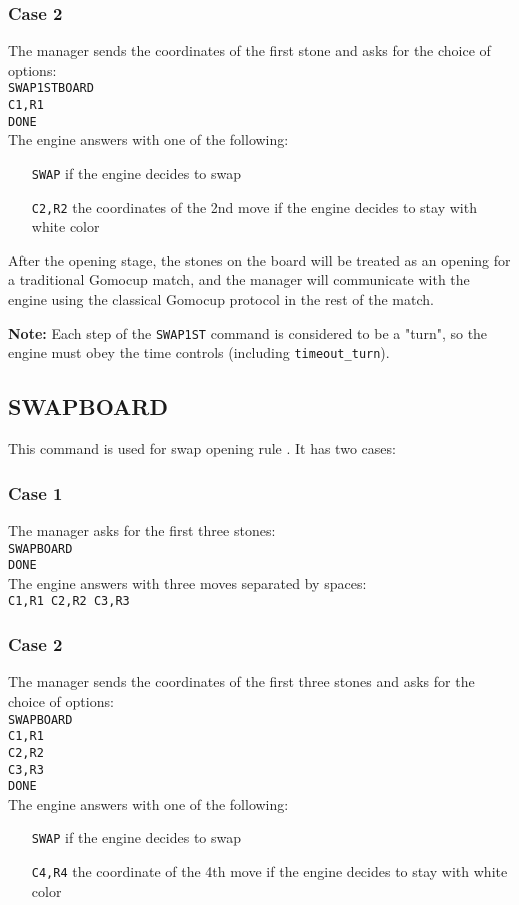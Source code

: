 \documentclass[12pt,a4paper]{article}
\begin{document}
\subsubsection{Case 2}
The manager sends the coordinates of the first stone and asks for the choice of options:\\
\texttt{SWAP1STBOARD}\\
\texttt{C1,R1}\\
\texttt{DONE}\\
The engine answers with one of the following:
\begin{enumerate}[leftmargin=7.5em]
\item[\texttt{SWAP}]{if the engine decides to swap}
\item[\texttt{C2,R2}]{the coordinates of the 2nd move if the engine decides to stay with white color}
\end{enumerate}

After the opening stage, the stones on the board will be treated as an opening for a traditional Gomocup match, and the manager will communicate with the engine using the classical Gomocup protocol in the rest of the match.

\textbf{Note:} Each step of the \texttt{SWAP1ST} command is considered to be a "turn", so the engine must obey the time controls (including \texttt{timeout{\_}turn}).


\subsection{SWAPBOARD}
\label{cmd_swap}
This command is used for swap opening rule \cite{gomoku_opening_rules}. It has two cases:

\subsubsection{Case 1}
The manager asks for the first three stones:\\
\texttt{SWAPBOARD}\\
\texttt{DONE}\\
The engine answers with three moves separated by spaces:\\
\texttt{C1,R1 C2,R2 C3,R3}

\subsubsection{Case 2}
The manager sends the coordinates of the first three stones and asks for the choice of options:\\
\texttt{SWAPBOARD}\\
\texttt{C1,R1}\\
\texttt{C2,R2}\\
\texttt{C3,R3}\\
\texttt{DONE}\\
The engine answers with one of the following:
\begin{enumerate}[leftmargin=7.5em]
\item[\texttt{SWAP}]{if the engine decides to swap}
\item[\texttt{C4,R4}]{the coordinate of the 4th move if the engine decides to stay with white color}
\end{enumerate}
\end{document}
